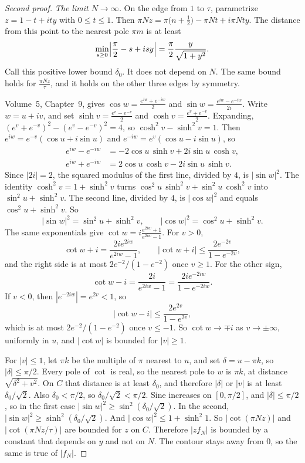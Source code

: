 \begin{proof}[Second proof]
\emph{The limit $N\to\infty$.} On the edge from $1$ to $\tau$, parametrize $z=1-t+ity$ with $0\le t\le1$. Then $\pi Nz=\pi\bigl(n+\frac12\bigr)-\pi Nt+i\pi Nty$. The distance from this point to the nearest pole $\pi m$ is at least
\[
\min_{s\ge0}\Bigl|\frac\pi2-s+isy\Bigr|=\frac\pi2\frac{y}{\sqrt{1+y^2}}.
\]
Call this positive lower bound $\delta_0$. It does not depend on $N$. The same bound holds for $\frac{\pi Nz}\tau$, and it holds on the other three edges by symmetry.

Volume~5, Chapter~9, gives $\cos w=\frac{e^{iw}+e^{-iw}}2$ and $\sin w=\frac{e^{iw}-e^{-iw}}{2i}$. Write $w=u+iv$, and set $\sinh v=\frac{e^v-e^{-v}}2$ and $\cosh v=\frac{e^v+e^{-v}}2$. Expanding, $(e^v+e^{-v})^2-(e^v-e^{-v})^2=4$, so $\cosh^2v-\sinh^2v=1$. Then $e^{iw}=e^{-v}(\cos u+i\sin u)$ and $e^{-iw}=e^{v}(\cos u-i\sin u)$, so
\[
\begin{aligned}e^{iw}-e^{-iw}&=-2\cos u\,\sinh v+2i\sin u\,\cosh v,\\
e^{iw}+e^{-iw}&=2\cos u\,\cosh v-2i\sin u\,\sinh v.\end{aligned}
\]
Since $|2i|=2$, the squared modulus of the first line, divided by $4$, is $|\sin w|^2$. The identity $\cosh^2v=1+\sinh^2v$ turns $\cos^2u\,\sinh^2v+\sin^2u\,\cosh^2v$ into $\sin^2u+\sinh^2v$. The second line, divided by $4$, is $|\cos w|^2$ and equals $\cos^2u+\sinh^2v$. So
\[
|\sin w|^2=\sin^2u+\sinh^2v,\qquad|\cos w|^2=\cos^2u+\sinh^2v.
\]
The same exponentials give $\cot w=i\frac{e^{2iw}+1}{e^{2iw}-1}$. For $v>0$,
\[
\cot w+i=\frac{2ie^{2iw}}{e^{2iw}-1},\qquad|\cot w+i|\le\frac{2e^{-2v}}{1-e^{-2v}},
\]
and the right side is at most $2e^{-2}/(1-e^{-2})$ once $v\ge1$. For the other sign,
\[
\cot w-i=\frac{2i}{e^{2iw}-1}=\frac{2ie^{-2iw}}{1-e^{-2iw}}.
\]
If $v<0$, then $|e^{-2iw}|=e^{2v}<1$, so
\[
|\cot w-i|\le\frac{2e^{2v}}{1-e^{2v}},
\]
which is at most $2e^{-2}/(1-e^{-2})$ once $v\le-1$. So $\cot w\to\mp i$ as $v\to\pm\infty$, uniformly in $u$, and $|\cot w|$ is bounded for $|v|\ge1$.

For $|v|\le1$, let $\pi k$ be the multiple of $\pi$ nearest to $u$, and set $\delta=u-\pi k$, so $|\delta|\le\pi/2$. Every pole of $\cot$ is real, so the nearest pole to $w$ is $\pi k$, at distance $\sqrt{\delta^2+v^2}$. On $C$ that distance is at least $\delta_0$, and therefore $|\delta|$ or $|v|$ is at least $\delta_0/\sqrt2$. Also $\delta_0<\pi/2$, so $\delta_0/\sqrt2<\pi/2$. Sine increases on $[0,\pi/2]$, and $|\delta|\le\pi/2$, so in the first case $|\sin w|^2\ge\sin^2(\delta_0/\sqrt2)$. In the second, $|\sin w|^2\ge\sinh^2(\delta_0/\sqrt2)$. And $|\cos w|^2\le1+\sinh^2 1$. So $|\cot(\pi Nz)|$ and $|\cot(\pi Nz/\tau)|$ are bounded for $z$ on $C$. Therefore $|zf_N|$ is bounded by a constant that depends on $y$ and not on $N$. The contour stays away from $0$, so the same is true of $|f_N|$.


\end{proof}
